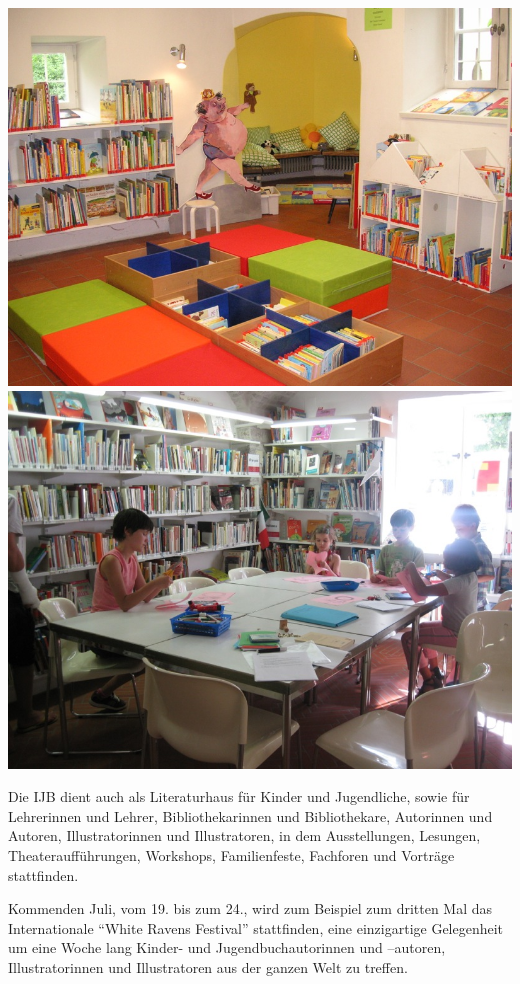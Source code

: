\documentclass[a4paper,
fontsize=11pt,
oneside,
numbers=noperiodatend,
parskip=half-,
bibliography=totoc,
final
]{scrartcl}
\begin{document}
\includegraphics{img/Bild19.jpg} \includegraphics{img/Bild19a.jpg}

Die IJB dient auch als Literaturhaus für Kinder und Jugendliche, sowie
für Lehrerinnen und Lehrer, Bibliothekarinnen und Bibliothekare,
Autorinnen und Autoren, Illustratorinnen und Illustratoren, in dem
Ausstellungen, Lesungen, Theateraufführungen, Workshops, Familienfeste,
Fachforen und Vorträge stattfinden.~

Kommenden Juli, vom 19. bis zum 24., wird zum Beispiel zum dritten Mal
das Internationale \enquote{White Ravens Festival} stattfinden, eine
einzigartige Gelegenheit um eine Woche lang Kinder- und
Jugendbuchautorinnen und --autoren, Illustratorinnen und Illustratoren
aus der ganzen Welt zu treffen.~
\end{document}
